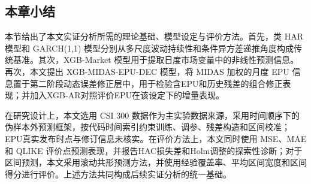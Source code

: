 \subsection{本章小结}

本节给出了本文实证分析所需的理论基础、模型设定与评价方法。首先，类 HAR 模型和 GARCH(1,1) 模型分别从多尺度波动持续性和条件异方差递推角度构成传统基准。其次，XGB-Market 模型用于提取日度市场变量中的非线性预测信息。再次，本文提出 XGB-MIDAS-EPU-DEC 模型，将 MIDAS 加权的月度 EPU 信息置于第二阶段动态误差修正层中，用于检验含EPU和历史残差的组合修正表现；并加入XGB-AR对照评价EPU在该设定下的增量表现。

在研究设计上，本文选用 CSI 300 数据作为主实验数据来源，采用时间顺序下的伪样本外预测框架，按代码时间索引约束训练、调参、残差构造和区间校准；EPU真实发布时点与修订信息未核实。在评价方法上，本文同时使用 MSE、MAE 和 QLIKE 评价点预测表现，并报告HAC损失差和Holm调整的探索性诊断；对于区间预测，本文采用滚动共形预测方法，并使用经验覆盖率、平均区间宽度和区间得分进行评价。上述方法共同构成后续实证分析的统一基础。